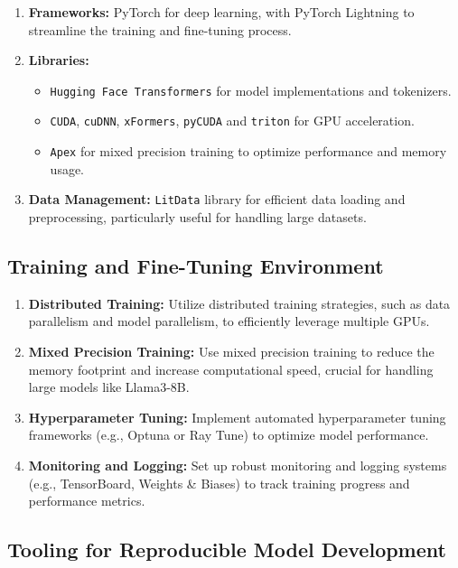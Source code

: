 \documentclass{article}
\begin{document}
\begin{enumerate}
    \item \textbf{Frameworks:} PyTorch for deep learning, with PyTorch Lightning to streamline the training and fine-tuning process.
    \item \textbf{Libraries:}
    \begin{itemize}
        \item \texttt{Hugging Face Transformers} for model implementations and tokenizers.
        \item \texttt{CUDA}, \texttt{cuDNN}, \texttt{xFormers}, \texttt{pyCUDA} and \texttt{triton} for GPU acceleration.
        \item \texttt{Apex} for mixed precision training to optimize performance and memory usage.
    \end{itemize}
    \item \textbf{Data Management:} \texttt{LitData} library for efficient data loading and preprocessing, particularly useful for handling large datasets.
\end{enumerate}

\subsection{Training and Fine-Tuning Environment}

\begin{enumerate}
    \item \textbf{Distributed Training:} Utilize distributed training strategies, such as data parallelism and model parallelism, to efficiently leverage multiple GPUs.
    \item \textbf{Mixed Precision Training:} Use mixed precision training to reduce the memory footprint and increase computational speed, crucial for handling large models like Llama3-8B.
    \item \textbf{Hyperparameter Tuning:} Implement automated hyperparameter tuning frameworks (e.g., Optuna or Ray Tune) to optimize model performance.
    \item \textbf{Monitoring and Logging:} Set up robust monitoring and logging systems (e.g., TensorBoard, Weights \& Biases) to track training progress and performance metrics.
\end{enumerate}

\subsection{Tooling for Reproducible Model Development}
\end{document}
